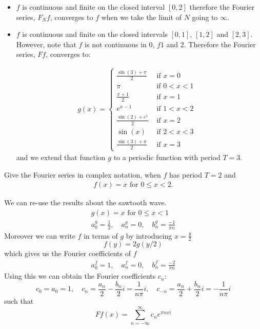 \documentclass[11pt]{article}
\begin{document}
\begin{solution}     
\begin{itemize}
\item $f$ is continuous and finite on the closed interval $[0,2]$ therefore the Fourier series, $F_N f$, converges to $f$ when we take the limit of $N$ going to $\infty$.
\item $f$ is continuous and finite on the closed intervals $[0,1]$, $[1,2]$ and $[2,3]$. 
However, note that $f$ is not continuous in $0$, $f1$ and $2$.
Therefore the Fourier series, $F f$, converges to: 

\begin{gather*}
            g(x) = \left\{\begin{array}{ll}
                            \frac{\sin(3) + \pi}{2} & \text{ if $x = 0$ }
						\\
                            \pi   & \text{ if $0 < x < 1$ }
                            \\
                            \frac{\pi + 1}{2} & \text{ if $x = 1$ }
						\\
                            e^{x-1} & \text{ if $1 < x < 2$ }
						\\
                            \frac{\sin(2) + e^1}{2} & \text{ if $x = 2$ }
						\\
                            \sin(x) & \text{ if $2 < x < 3$ }
						\\
                            \frac{\sin(3) + \pi}{2} & \text{ if $x = 3$ }
                          \end{array}\right.
\end{gather*}
and we extend that function $g$ to a periodic function with period $T = 3$. 
\end{itemize}
\end{solution}

\begin{exercise}
    Give the Fourier series in complex notation, when $f$ has period $T = 2$ and 
    \begin{gather*}
        f(x) = x \text{ for } 0 \leq x < 2.
    \end{gather*}
\end{exercise}
\begin{solution}     
We can re-use the results about the sawtooth wave.
\begin{gather*}
    g(x)=x \text { for } 0 \leq x<1
    \\
    a_0^g = \frac{1}{2},\quad a_n^g = 0, \quad b_n^g = \frac{-1}{\pi n}
\end{gather*}
Moreover we can write $f$ in terms of $g$ by introducing $x = \frac{y}{2}$
\[
    f(y) = 2g(y/2)
\]
which gives us the Fourier coefficients of $f$
\begin{gather*}
    a_0^f = 1,\quad a_n^f = 0, \quad b_n^f = \frac{-2}{\pi n}
\end{gather*}
Using this we can obtain the Fourier coefficients $c_n$:
\[
    c_0 = a_0 = 1,\quad c_n=\frac{a_n}{2}-\frac{b_n}{2} i = \frac{1}{n\pi}i, \quad c_{-n}=\frac{a_n}{2}+\frac{b_n}{2} i = -\frac{1}{n\pi}i
\]
such that 
\[
    F f(x)=\sum_{n=-\infty}^{\infty} c_n e^{\pi n x i}
\]
\end{solution}
\end{document}
